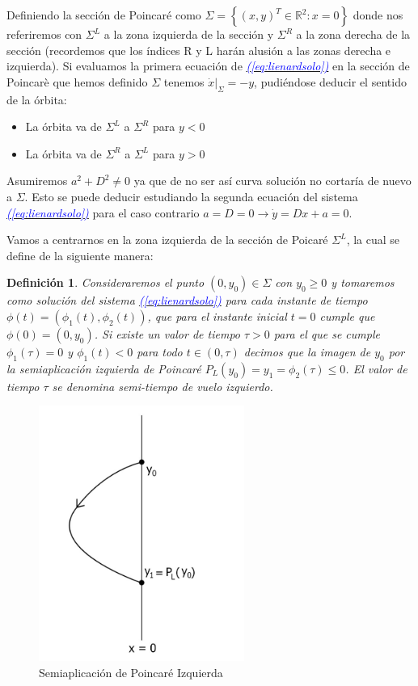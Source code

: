 \documentclass[12pt,a4paper]{report} %
\newtheorem{definicion}{Definición} %
\newcommand{\eref}[1]{\hyperref[#1]{\textcolor{blue}{\textit{(\ref*{#1})}}}}
\begin{document}
	Definiendo la sección de Poincaré como $\varSigma=\left\{(x,y)^T\in \mathbb{R}^2:x=0\right\}$ donde nos referiremos con $\varSigma^L$ a la zona izquierda de la sección y $\varSigma^R$ a la zona derecha de la sección (recordemos que los índices R y L harán alusión a las zonas derecha e izquierda). Si evaluamos la primera ecuación de \eref{eq:lienardsolo} en la sección de Poincarè que hemos definido $\varSigma$ tenemos $\dot{x}|_{\varSigma}=-y$, pudiéndose deducir el sentido de la órbita:
	
	\begin{itemize}
		\item La órbita va de $\varSigma^L$ a $\varSigma^R$ para $y<0$
		\item La órbita va de $\varSigma^R$ a $\varSigma^L$ para $y>0$
	\end{itemize}
	
	Asumiremos $a^2+D^2\neq0$ ya que de no ser así curva solución no cortaría de nuevo a $\varSigma$. Esto se puede deducir estudiando la segunda ecuación del sistema \eref{eq:lienardsolo} para el caso contrario $a=D=0 \longrightarrow \dot{y}=Dx+a=0$.
	
	\vspace{0.5cm}Vamos a centrarnos en la zona izquierda de la sección de Poicaré $\varSigma^L$, la cual se define de la siguiente manera:

	\begin{definicion}
		\label{def6}
		Consideraremos el punto $(0,y_0)\in \varSigma$ con $y_0\geq0$ y tomaremos como solución del sistema \eref{eq:lienardsolo} para cada instante de tiempo $\phi(t)=(\phi_1(t),\phi_2(t))$, que para el instante inicial $t=0$ cumple que $\phi(0)=(0,y_0)$. Si existe un valor de tiempo $\tau>0$ para el que se cumple $\phi_1(\tau)=0$ y $\phi_1(t)<0$ para todo $t\in(0,\tau)$ decimos que la imagen de $y_0$ por la semiaplicación izquierda de Poincaré $P_L(y_0)=y_1=\phi_2(\tau)\leq0$. El valor de tiempo $\tau$ se denomina semi-tiempo de vuelo izquierdo.
	\end{definicion}
	
	\begin{figure}[h]
		\centering
		\includegraphics[width=0.6\textwidth]{semiL.jpg}
		\caption{ Semiaplicación de Poincaré Izquierda}
		\label{fig:semiL}
	\end{figure}\smallskip
	\newpage
	
\end{document}
